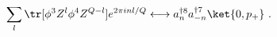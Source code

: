 \begin{equation}
 \sum_{l} \tr [\phi^3 Z^l \phi^4 Z^{Q-l}]e^{2 \pi i n l /Q}
   \longleftrightarrow 
   a^{\dagger  8}_n  a^{\dagger  7 }_{-n} \ket{0,p_+} ~.
\end{equation}

